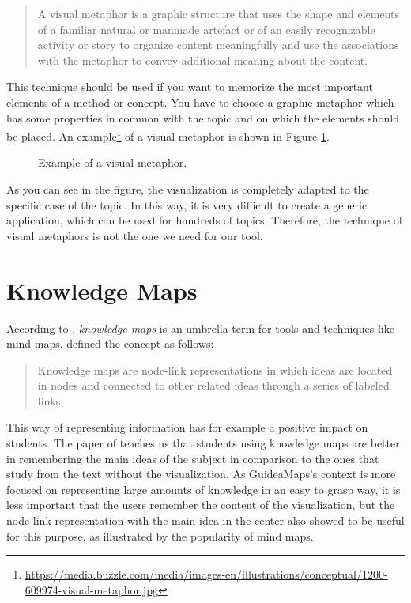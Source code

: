 \begin{quote}
A visual metaphor is a graphic structure that uses the shape and elements of a familiar natural or manmade artefact or of an easily recognizable activity or story to organize content meaningfully and use the associations with the metaphor to convey additional meaning about the content. \hfill \citep{eppler-2006}
\end{quote}

This technique should be used if you want to memorize the most important elements of a method or concept. You have to choose a graphic metaphor which has some properties in common with the topic and on which the elements should be placed. \citep{eppler-2006} An example\footnote{\url{https://media.buzzle.com/media/images-en/illustrations/conceptual/1200-609974-visual-metaphor.jpg}} of a visual metaphor is shown in Figure \ref{fig:visual-metaphor}.

\begin{figure}[H]
	\centering
	\caption{Example of a visual metaphor.}
	\label{fig:visual-metaphor}
\end{figure}

As you can see in the figure, the visualization is completely adapted to the specific case of the topic. In this way, it is very difficult to create a generic application, which can be used for hundreds of topics. Therefore, the technique of visual metaphors is not the one we need for our tool.


\section{Knowledge Maps}
According to \cite{knowledgemapsbalaid}, \textit{knowledge maps} is an umbrella term for tools and techniques like mind maps. \cite{knowledgemapsodonnell} defined the concept as follows:

\begin{quote}
Knowledge maps are node-link representations in which ideas are located in nodes and connected to other related ideas through a series of labeled links. \hfill 
\end{quote}

This way of representing information has for example a positive impact on students. The paper of \cite{knowledgemapsodonnell} teaches us that students using knowledge maps are better in remembering the main ideas of the subject in comparison to the ones that study from the text without the visualization. As GuideaMaps's context is more focused on representing large amounts of knowledge in an easy to grasp way, it is less important that the users remember the content of the visualization, but the node-link representation with the main idea in the center also showed to be useful for this purpose, as illustrated by the popularity of mind maps.\\

